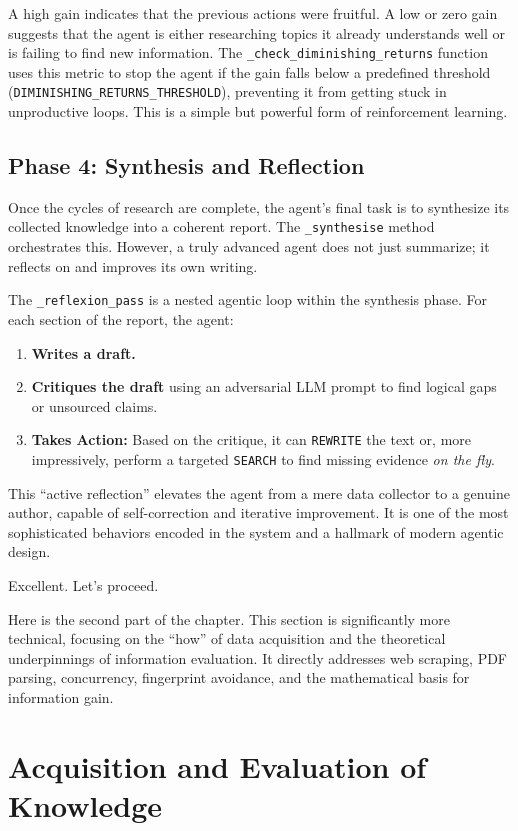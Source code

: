 \documentclass[12pt, a4paper]{article}
\begin{document}
A high gain indicates that the previous actions were fruitful. A low or zero gain suggests that the agent is either researching topics it already understands well or is failing to find new information. The \verb|_check_diminishing_returns| function uses this metric to stop the agent if the gain falls below a predefined threshold (\verb|DIMINISHING_RETURNS_THRESHOLD|), preventing it from getting stuck in unproductive loops. This is a simple but powerful form of reinforcement learning.

\subsection{Phase 4: Synthesis and Reflection}

Once the cycles of research are complete, the agent's final task is to synthesize its collected knowledge into a coherent report. The \verb|_synthesise| method orchestrates this. However, a truly advanced agent does not just summarize; it reflects on and improves its own writing.

The \verb|_reflexion_pass| is a nested agentic loop within the synthesis phase. For each section of the report, the agent:
\begin{enumerate}
    \item \textbf{Writes a draft.}
    \item \textbf{Critiques the draft} using an adversarial LLM prompt to find logical gaps or unsourced claims.
    \item \textbf{Takes Action:} Based on the critique, it can \verb|REWRITE| the text or, more impressively, perform a targeted \verb|SEARCH| to find missing evidence \textit{on the fly}.
\end{enumerate}

This ``active reflection'' elevates the agent from a mere data collector to a genuine author, capable of self-correction and iterative improvement. It is one of the most sophisticated behaviors encoded in the system and a hallmark of modern agentic design.

Excellent. Let's proceed.

Here is the second part of the chapter. This section is significantly more technical, focusing on the ``how'' of data acquisition and the theoretical underpinnings of information evaluation. It directly addresses web scraping, PDF parsing, concurrency, fingerprint avoidance, and the mathematical basis for information gain.

\section{Acquisition and Evaluation of Knowledge}
\end{document}

